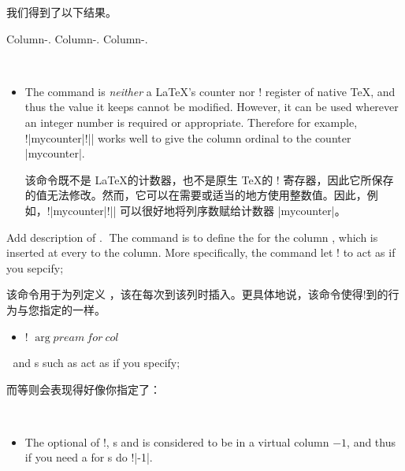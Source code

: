\begin{description}
我们得到了以下结果。

\par\medskip
\begin{paracol}{3}
Column-\thecolumn.\switchcolumn
Column-\thecolumn.\switchcolumn
Column-\thecolumn.
\end{paracol}

\begin{itemize}
\item
The command is {\em neither} a \LaTeX's counter nor \!\count! register of
native \TeX{}, and thus the value it keeps cannot be modified.  However,
it can be used wherever an integer number is required or appropriate.
Therefore for example, \!\setcounter!|{mycounter}{|\!\thecolumn!|}| works
well to give the column ordinal to the counter |mycounter|.

该命令既不是 \LaTeX 的计数器，也不是原生 \TeX 的 \!\count! 寄存器，因此它所保存的值无法修改。然而，它可以在需要或适当的地方使用整数值。因此，例如，\!\setcounter!|{mycounter}{|\!\thecolumn!|}| 可以很好地将列序数赋给计数器 |mycounter|。
\end{itemize}



\item[\Midx{\!\definecolumnpreamble!}\marg{col}\marg{pream}]\mbox{}\par
{}
{Add description of .}
The command is to define the {\Uidx\colpream}  for the column
, which is inserted at every \cswitch{} to the column.  More
specifically, the command let \!\switchcolumn! to  act as if you
sepcify;

该命令用于为列定义{\Uidx\colpream} ，该在每次\cswitch{}到该列时插入。更具体地说，该命令使得\!\switchcolumn!到的行为与您指定的一样。

\begin{itemize}\item[]
\!\switchcolumn! $\arg{pream\ for\ col}$
\end{itemize}

and \csenv{}s such as  act as if you specify;

而等\csenv{}则会表现得好像你指定了：


\begin{itemize}
\item
\begingroup{}
The optional \sptext{} of \!\switchcolumn!, \csenv{}s and \beginparacol{}
is considered to be in a virtual column $-1$, and thus if you need a
\Colpream{} for \sptext{}s do \!!|{-1}|.


\end{itemize}
\end{description}
